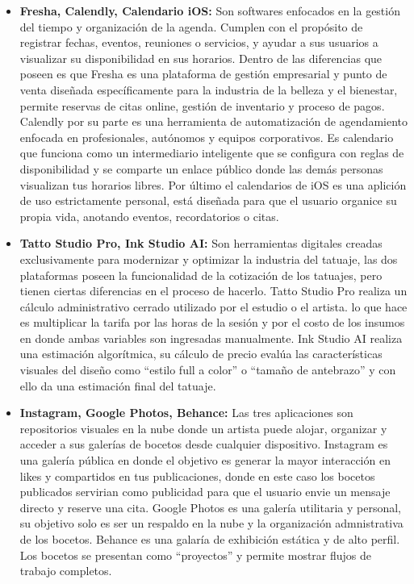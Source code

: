 \documentclass[12pt,letterpaper,oneside]{report}
\begin{document}
\begin{itemize}
  \item \textbf{Fresha, Calendly, Calendario iOS:} Son softwares enfocados en la gestión del tiempo y organización de la agenda. Cumplen con el propósito de registrar fechas, eventos, reuniones o servicios, y ayudar a sus usuarios a visualizar su disponibilidad en sus horarios. Dentro de las diferencias que poseen es que Fresha\cite{fresha} es una plataforma de gestión empresarial y punto de venta diseñada específicamente para la industria de la belleza y el bienestar, permite reservas de citas online, gestión de inventario y proceso de pagos. Calendly\cite{calendly} por su parte es una herramienta de automatización de agendamiento enfocada en profesionales, autónomos y equipos corporativos. Es calendario que funciona como un intermediario inteligente que se configura con reglas de disponibilidad y se comparte un enlace público donde las demás personas visualizan tus horarios libres. Por último el calendarios de iOS\cite{calendarioios} es una aplición de uso estrictamente personal, está diseñada para que el usuario organice su propia vida, anotando eventos, recordatorios o citas.

  \item \textbf{Tatto Studio Pro, Ink Studio AI:} Son herramientas digitales creadas exclusivamente para modernizar y optimizar la industria del tatuaje, las dos plataformas poseen la funcionalidad de la cotización de los tatuajes, pero tienen ciertas diferencias en el proceso de hacerlo. Tatto Studio Pro\cite{tattoostudiopro} realiza un cálculo administrativo cerrado utilizado por el estudio o el artista. lo que hace es multiplicar la tarifa por las horas de la sesión y por el costo de los insumos en donde ambas variables son ingresadas manualmente. Ink Studio AI\cite{inkstudioai} realiza una estimación algorítmica, su cálculo de precio evalúa las características visuales del diseño como ``estilo full a color'' o ``tamaño de antebrazo'' y con ello da una estimación final del tatuaje.

  \item \textbf{Instagram, Google Photos, Behance:} Las tres aplicaciones son repositorios visuales en la nube donde un artista puede alojar, organizar y acceder a sus galerías de bocetos desde cualquier dispositivo. Instagram\cite{instagram} es una galería pública en donde el objetivo es generar la mayor interacción en likes y compartidos en tus publicaciones, donde en este caso los bocetos publicados servirian como publicidad para que el usuario envie un mensaje directo y reserve una cita. Google Photos\cite{googlephotos} es una galería utilitaria y personal, su objetivo solo es ser un respaldo en la nube y la organización admnistrativa de los bocetos. Behance\cite{behance} es una galaría de exhibición estática y de alto perfil. Los bocetos se presentan como ``proyectos'' y permite mostrar flujos de trabajo completos.


\end{itemize}
\end{document}
